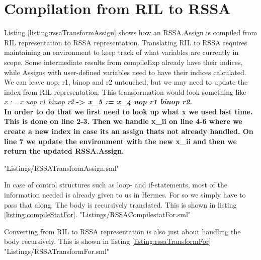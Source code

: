 \section{Compilation from RIL to RSSA}
Listing \ref{listing:rssaTransformAssign} shows how an RSSA.Assign is compiled from RIL representation to RSSA representation. Translating RIL to RSSA requires maintaining an environment to keep track of what variables are currently in scope. Some intermediate results from compileExp already have their indices, while Assigns with user-defined variables need to have their indices calculated. We can leave uop, r1, binop and r2 untouched, but we may need to update the index from RIL representation. This transformation would look something like \\
\emph{x := x uop r1 binop r2} \bf{->} \emph{x\_5 := x\_4 uop r1 binop r2}. \\
In order to do that we first need to look up what x we used last time. This is done on line 2-3. Then we handle x\_ii on line 4-6 where we create a new index in case its an assign thats not already handled. On line 7 we update the environment with the new x\_ii and then we return the updated RSSA.Assign.

 {"Listings/RSSATransformAssign.sml"}

In case of control structures such as loop- and if-statements, most of the information needed is already given to us in Hermes. For so we simply have to pass that along. The body is recursively translated. This is shown in listing \ref{listing:compileStatFor}.
 {"Listings/RSSACompilestatFor.sml"}

Converting from RIL to RSSA representation is also just about handling the body recursively. This is shown in listing \ref{listing:rssaTransformFor}
 {"Listings/RSSATransformFor.sml"}


